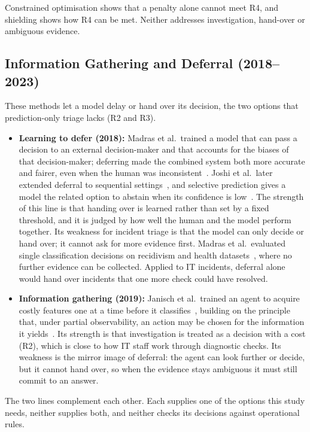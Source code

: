 Constrained optimisation shows that a penalty alone cannot meet R4, and shielding shows how R4 can be met. Neither addresses investigation, hand-over or ambiguous evidence.

\subsection{Information Gathering and Deferral (2018--2023)}

These methods let a model delay or hand over its decision, the two options that prediction-only triage lacks (R2 and R3).

\begin{itemize}
\item \textbf{Learning to defer (2018):} Madras et al.\ trained a model that can pass a decision to an external decision-maker and that accounts for the biases of that decision-maker; deferring made the combined system both more accurate and fairer, even when the human was inconsistent~\cite{madras2018}. Joshi et al.\ later extended deferral to sequential settings~\cite{joshi2023}, and selective prediction gives a model the related option to abstain when its confidence is low~\cite{geifman2019}. The strength of this line is that handing over is learned rather than set by a fixed threshold, and it is judged by how well the human and the model perform together. Its weakness for incident triage is that the model can only decide or hand over; it cannot ask for more evidence first. Madras et al.\ evaluated single classification decisions on recidivism and health datasets~\cite{madras2018}, where no further evidence can be collected. Applied to IT incidents, deferral alone would hand over incidents that one more check could have resolved.

\item \textbf{Information gathering (2019):} Janisch et al.\ trained an agent to acquire costly features one at a time before it classifies~\cite{janisch2019}, building on the principle that, under partial observability, an action may be chosen for the information it yields~\cite{kaelbling1998}. Its strength is that investigation is treated as a decision with a cost (R2), which is close to how IT staff work through diagnostic checks. Its weakness is the mirror image of deferral: the agent can look further or decide, but it cannot hand over, so when the evidence stays ambiguous it must still commit to an answer.
\end{itemize}

The two lines complement each other. Each supplies one of the options this study needs, neither supplies both, and neither checks its decisions against operational rules.

